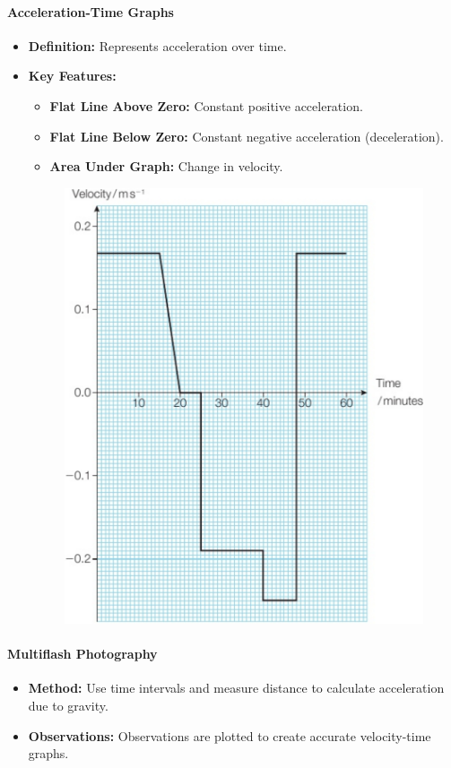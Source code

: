 \paragraph{Acceleration-Time Graphs}
\begin{itemize}
    \item \textbf{Definition:} Represents acceleration over time.
    \item \textbf{Key Features:}
    \begin{itemize}
        \item \textbf{Flat Line Above Zero:} Constant positive acceleration.
        \item \textbf{Flat Line Below Zero:} Constant negative acceleration (deceleration).
        \item \textbf{Area Under Graph:} Change in velocity.
    \end{itemize}
    \begin{figure}[H]
        \centering
        \includegraphics[scale=0.15]{Physics/1A/Images/1A-2-3.png}
    \end{figure}
\end{itemize}

\paragraph{Multiflash Photography}
\begin{itemize}
    \item \textbf{Method:} Use time intervals and measure distance to calculate acceleration due to gravity.
    \item \textbf{Observations:} Observations are plotted to create accurate velocity-time graphs.
\end{itemize}